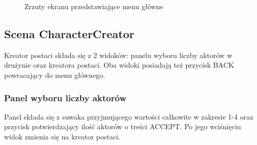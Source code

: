 \documentclass{SGGW-thesis}
\begin{document}
\begin{figure}[H]
  \hfill
  \hfill
  \hfill
  \caption{Zrzuty ekranu przedstawiające menu główne}
\end{figure}
\pagebreak
\subsection{Scena CharacterCreator}
Kreator postaci składa się z 2 widoków: panelu wyboru liczby aktorów w drużynie oraz kreatora postaci. Oba widoki posiadają też przycisk BACK powracający do menu głównego.


\subsubsection{Panel wyboru liczby aktorów}
Panel składa się z suwaka przyjmującego wartości całkowite w zakresie 1-4 oraz przycisk potwierdzający ilość aktorów o treści ACCEPT. Po jego wciśnięciu widok zmienia się na kreator postaci.
\end{document}
